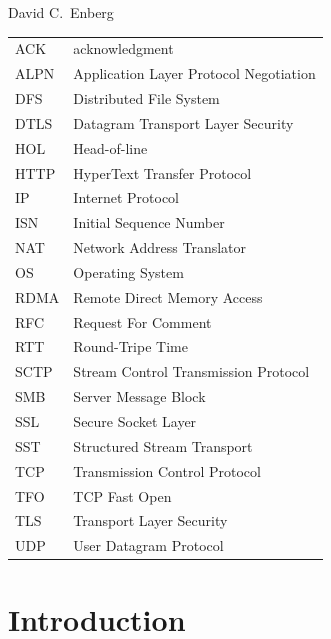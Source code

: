 \documentclass[english, 12pt, a4paper, elec, utf8, a-2b, online]{aaltothesis}
\begin{document}
\vspace{5mm}
{\hfill David C.\ Enberg \hspace{1cm}}

\newpage


\thesistableofcontents



\begin{tabular}{ll}
ACK & acknowledgment \\
ALPN & Application Layer Protocol Negotiation \\
DFS & Distributed File System \\
DTLS & Datagram Transport Layer Security \\
HOL & Head-of-line \\
HTTP & HyperText Transfer Protocol \\
IP & Internet Protocol \\
ISN & Initial Sequence Number \\
NAT & Network Address Translator \\
OS & Operating System \\
RDMA & Remote Direct Memory Access \\
RFC & Request For Comment \\
RTT & Round-Tripe Time \\
SCTP & Stream Control Transmission Protocol \\
SMB & Server Message Block \\
SSL & Secure Socket Layer \\
SST & Structured Stream Transport \\
TCP & Transmission Control Protocol \\
TFO & TCP Fast Open \\
TLS & Transport Layer Security \\
UDP & User Datagram Protocol \\
\end{tabular}


\cleardoublepage

\section{Introduction}
\label{sec:intro}

\thispagestyle{empty}
\end{document}
